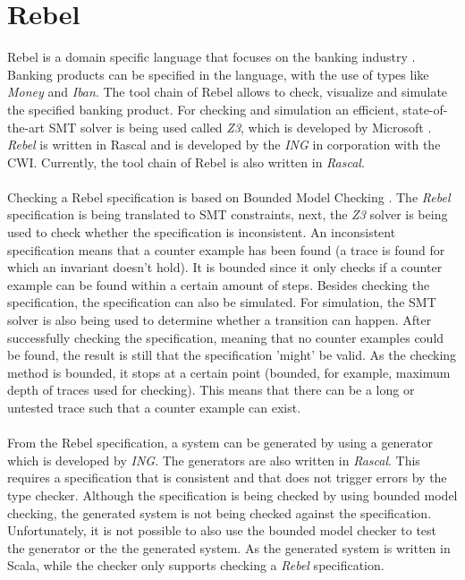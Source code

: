 \section{Rebel}
Rebel is a domain specific language that focuses on the banking industry \cite{stoel2016solving}. Banking products can be specified in the language, with the use of types like \textit{Money} and \textit{Iban}. The tool chain of Rebel allows to check, visualize and simulate the specified banking product. For checking and simulation an efficient, state-of-the-art SMT solver is being used called \textit{Z3}, which is developed by Microsoft \cite{de2008z3}. \textit{Rebel} is written in Rascal and is developed by the \textit{ING} in corporation with the CWI. Currently, the tool chain of Rebel is also written in \textit{Rascal}.\\
\\
Checking a Rebel specification is based on Bounded Model Checking \cite{stoel2016solving}. The \textit{Rebel} specification is being translated to SMT constraints, next, the \textit{Z3} solver is being used to check whether the specification is inconsistent. An inconsistent specification means that a counter example has been found (a trace is found for which an invariant doesn't hold). It is bounded since it only checks if a counter example can be found within a certain amount of steps. Besides checking the specification, the specification can also be simulated. For simulation, the SMT solver is also being used to determine whether a transition can happen. After successfully checking the specification, meaning that no counter examples could be found, the result is still that the specification 'might' be valid. As the checking method is bounded, it stops at a certain point (bounded, for example, maximum depth of traces used for checking). This means that there can be a long or untested trace such that a counter example can exist.\\
\\
From the Rebel specification, a system can be generated by using a generator which is developed by \textit{ING}. The generators are also written in \textit{Rascal}. This requires a specification that is consistent and that does not trigger errors by the type checker. Although the specification is being checked by using bounded model checking, the generated system is not being checked against the specification. Unfortunately, it is not possible to also use the bounded model checker to test the generator or the the generated system. As the generated system is written in Scala, while the checker only supports checking a \textit{Rebel} specification. 

